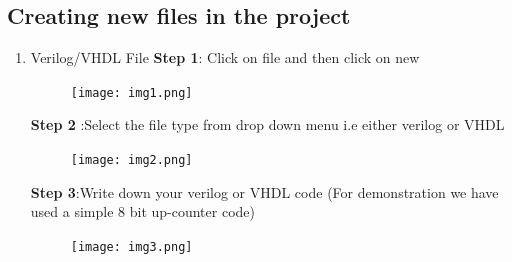 \documentclass[12pt,singleside,a4paper]{article}
\begin{document}
\subsection{Creating new files in the project}
\begin{enumerate}
\item Verilog/VHDL File
\newline
\newline
\textbf{Step 1}: Click on file and then click on new
\begin{figure}[H]
\centering
\texttt{[image: img1.png]}
\end{figure}
\newpage
\noindent \textbf{Step 2} :Select the file type from drop down menu i.e either verilog or VHDL
\begin{figure}[H]
\centering
\texttt{[image: img2.png]}
\end{figure}
\noindent \textbf{Step 3}:Write down your verilog or VHDL code (For demonstration we have used a simple 8 bit up-counter code)
\begin{figure}[H]
\centering
\texttt{[image: img3.png]}
\end{figure}


\end{enumerate}
\end{document}

